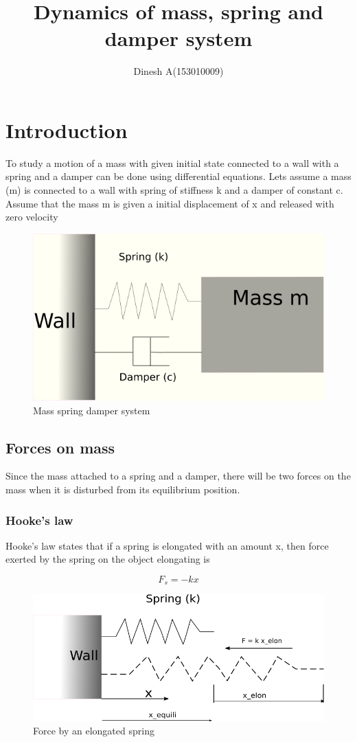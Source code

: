 \documentclass{article}
\begin{document}
\title{Dynamics of mass, spring and damper system}
\author{Dinesh A(153010009)}
\maketitle


\section{Introduction}
To study a motion of a mass with given initial state connected to a
wall with a spring and a damper can be done using differential
equations. Lets assume a mass (m) is connected to a wall with spring
of stiffness k and a damper of constant c. Assume that the mass m is
given a initial displacement of x and released with zero velocity
\begin{figure}
  \centering
  \includegraphics[width=0.7\linewidth]{mass_damper}
  \caption{Mass spring damper system}
\label{fig:msd}
\end{figure}

\subsection{Forces on mass}
Since the mass attached to a spring and a damper, there will be two forces 
on the mass when it is disturbed from its equilibrium position.

\subsubsection{Hooke's law}

Hooke's law  states that if a spring is  elongated with  an amount  x, then
\label{fig:hookes_law}force exerted by the spring on the object elongating is

\begin{equation}
  F_s = -kx
\end{equation}

\begin{figure}
  \centering
  \includegraphics[width=0.7\linewidth]{hookes_law}
  \caption{Force by an elongated spring}
\end{figure}
\end{document}
